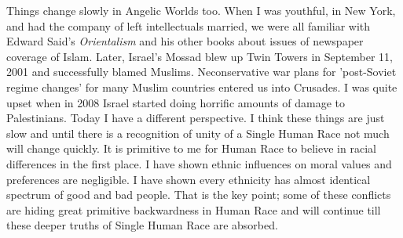\documentclass{amsart}
\begin{document}
Things change slowly in Angelic Worlds too.  When I was youthful, in New York, and had the company of left intellectuals married, we were all familiar with Edward Said's {\em Orientalism} and his other books about issues of newspaper coverage of Islam.  Later, Israel's Mossad blew up Twin Towers in September 11, 2001 and successfully blamed Muslims.  Neconservative war plans for 'post-Soviet regime changes' for many Muslim countries entered us into Crusades.  I was quite upset when in 2008 Israel started doing horrific amounts of 
damage to Palestinians.  Today I have a different perspective.  I think these things are just slow and until there is a recognition of unity of a Single Human Race not much will change quickly.  It is primitive to me for Human Race to believe in racial differences in the first place.  I have shown ethnic influences on moral values and preferences are negligible.  I have shown every ethnicity has almost identical spectrum of good and bad people.  That is the key point; some of these conflicts are hiding great primitive backwardness in Human Race and will continue till these deeper truths of Single Human Race are absorbed.
\end{document}
